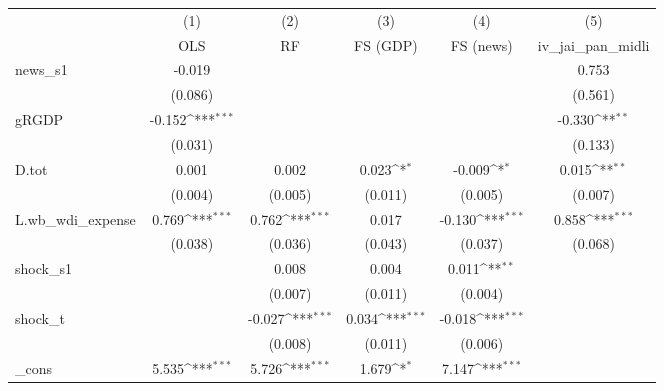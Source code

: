 {
\def\sym#1{\ifmmode^{#1}\else\(^{#1}\)\fi}
\begin{tabular}{l*{5}{c}}
\toprule
            &\multicolumn{1}{c}{(1)}&\multicolumn{1}{c}{(2)}&\multicolumn{1}{c}{(3)}&\multicolumn{1}{c}{(4)}&\multicolumn{1}{c}{(5)}\\
            &\multicolumn{1}{c}{OLS}&\multicolumn{1}{c}{RF}&\multicolumn{1}{c}{FS (GDP)}&\multicolumn{1}{c}{FS (news)}&\multicolumn{1}{c}{iv\_jai\_pan\_midli}\\
\midrule
news\_s1     &      -0.019         &                     &                     &                     &       0.753         \\
            &     (0.086)         &                     &                     &                     &     (0.561)         \\
\addlinespace
gRGDP       &      -0.152\sym{***}&                     &                     &                     &      -0.330\sym{**} \\
            &     (0.031)         &                     &                     &                     &     (0.133)         \\
\addlinespace
D.tot       &       0.001         &       0.002         &       0.023\sym{*}  &      -0.009\sym{*}  &       0.015\sym{**} \\
            &     (0.004)         &     (0.005)         &     (0.011)         &     (0.005)         &     (0.007)         \\
\addlinespace
L.wb\_wdi\_expense&       0.769\sym{***}&       0.762\sym{***}&       0.017         &      -0.130\sym{***}&       0.858\sym{***}\\
            &     (0.038)         &     (0.036)         &     (0.043)         &     (0.037)         &     (0.068)         \\
\addlinespace
shock\_s1    &                     &       0.008         &       0.004         &       0.011\sym{**} &                     \\
            &                     &     (0.007)         &     (0.011)         &     (0.004)         &                     \\
\addlinespace
shock\_t     &                     &      -0.027\sym{***}&       0.034\sym{***}&      -0.018\sym{***}&                     \\
            &                     &     (0.008)         &     (0.011)         &     (0.006)         &                     \\
\addlinespace
\_cons      &       5.535\sym{***}&       5.726\sym{***}&       1.679\sym{*}  &       7.147\sym{***}&                     \\

\end{tabular}}
